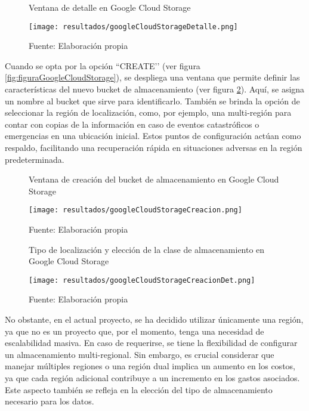 \newpage

\begin{figure}[h]
	\centering
	\caption{Ventana de detalle en Google Cloud Storage}
	\texttt{[image: resultados/googleCloudStorageDetalle.png]}
	\caption*{\footnotesize Fuente: Elaboración propia}
	\label{fig:figuraGoogleCloudStorageDetalle}
\end{figure}

Cuando se opta por la opción ``CREATE’’ (ver figura \ref{fig:figuraGoogleCloudStorage}), se despliega una ventana que permite definir las características del nuevo bucket de almacenamiento (ver figura \ref{fig:figuraGoogleCloudStorageCreacion}). Aquí, se asigna un nombre al bucket que sirve para identificarlo. También se brinda la opción de seleccionar la región de localización, como, por ejemplo, una multi-región para contar con copias de la información en caso de eventos catastróficos o emergencias en una ubicación inicial. Estos puntos de configuración actúan como respaldo, facilitando una recuperación rápida en situaciones adversas en la región predeterminada.

\newpage

\begin{figure}[h]
	\centering
	\caption{Ventana de creación del bucket de almacenamiento en Google Cloud Storage}
	\texttt{[image: resultados/googleCloudStorageCreacion.png]}
	\caption*{\footnotesize Fuente: Elaboración propia}
	\label{fig:figuraGoogleCloudStorageCreacion}
\end{figure}

\begin{figure}[h]
	\centering
	\caption{Tipo de localización y elección de la clase de almacenamiento en Google Cloud Storage}
	\texttt{[image: resultados/googleCloudStorageCreacionDet.png]}
	\caption*{\footnotesize Fuente: Elaboración propia}
	\label{fig:figuraGoogleCloudStorageCreacionDet}
\end{figure}

\newpage


No obstante, en el actual proyecto, se ha decidido utilizar únicamente una región, ya que no es un proyecto que, por el momento, tenga una necesidad de escalabilidad masiva. En caso de requerirse, se tiene la flexibilidad de configurar un almacenamiento multi-regional. Sin embargo, es crucial considerar que manejar múltiples regiones o una región dual implica un aumento en los costos, ya que cada región adicional contribuye a un incremento en los gastos asociados. Este aspecto también se refleja en la elección del tipo de almacenamiento necesario para los datos. \newline

